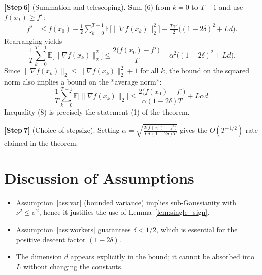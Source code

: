 \documentclass[11pt]{article}
\newcommand{\E}{\mathbb{E}}
\begin{document}
\noindent\textbf{[Step 6]} (Summation and telescoping).  
Sum (6) from $k=0$ to $T-1$ and use $f(x_{T})\ge f^{\star}$:
\[
\begin{aligned}
    f^{\star}
    &\le f(x_{0})
        -\frac{1}{2}\sum_{k=0}^{T-1}\E\!\big[\|\nabla f(x_{k})\|_{2}^{2}\big]
        +\frac{T\alpha^{2}}{2}\big((1-2\delta)^{2}+L d\big).
\end{aligned}
\]
Rearranging yields
\[
    \frac{1}{T}\sum_{k=0}^{T-1}\E\!\big[\|\nabla f(x_{k})\|_{2}^{2}\big]
    \le
    \frac{2\big(f(x_{0})-f^{\star}\big)}{T}
    +\alpha^{2}\big((1-2\delta)^{2}+L d\big).
\tag{7}
\]
Since $\|\nabla f(x_{k})\|_{2}\le \|\nabla f(x_{k})\|_{2}^{2}+1$ for all $k$,
the bound on the squared norm also implies a bound on the *average norm*:
\[
    \frac{1}{T}\sum_{k=0}^{T-1}\E\!\big[\|\nabla f(x_{k})\|_{2}\big]
    \le
    \frac{2\big(f(x_{0})-f^{\star}\big)}{\alpha(1-2\delta)T}
    +L\alpha d .
\tag{8}
\]
Inequality (8) is precisely the statement (1) of the theorem.

\noindent\textbf{[Step 7]} (Choice of stepsize).  
Setting $\alpha = \sqrt{\frac{2\big(f(x_{0})-f^{\star}\big)}{L d\,(1-2\delta)T}}$
gives the $O(T^{-1/2})$ rate claimed in the theorem.

\hfill\qedsymbol

\section*{Discussion of Assumptions}
\begin{itemize}
    \item Assumption~\ref{ass:var} (bounded variance) implies sub‑Gaussianity with
          $\nu^{2}\le\sigma^{2}$, hence it justifies the use of Lemma~\ref{lem:single_sign}.
    \item Assumption~\ref{ass:workers} guarantees $\delta<1/2$, which is essential for
          the positive descent factor $(1-2\delta)$.
    \item The dimension $d$ appears explicitly in the bound; it cannot be absorbed
          into $L$ without changing the constants.
\end{itemize}

\end{document}
